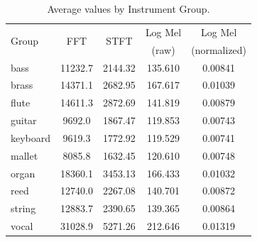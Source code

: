 \documentclass[10pt,conference]{IEEEtran}
\begin{document}

\begin{table}[htb] \small
  \caption{Average values by Instrument Group.}
  \label{tab:means_by_group_updated}
  \begin{tabular*}{\columnwidth}
	{@{\extracolsep{\fill}}lcccc}
    \toprule
    \multirow{2}{*}{Group} & \multirow{2}{*}{FFT} & \multirow{2}{*}{STFT} & Log Mel& Log Mel \\
    &   &   &   (raw)  & (normalized) \\
    \midrule
    bass     & 11232.7 & 2144.32 & 135.610 & 0.00841 \\
    brass    & 14371.1 & 2682.95 & 167.617 & 0.01039 \\
    flute    & 14611.3 & 2872.69 & 141.819 & 0.00879 \\
    guitar   & 9692.0  & 1867.47 & 119.853 & 0.00743 \\
    keyboard & 9619.3  & 1772.92 & 119.529 & 0.00741 \\
    mallet   & 8085.8  & 1632.45 & 120.610 & 0.00748 \\
    organ    & 18360.1 & 3453.13 & 166.433 & 0.01032 \\
    reed     & 12740.0 & 2267.08 & 140.701 & 0.00872 \\
    string   & 12883.7 & 2390.65 & 139.365 & 0.00864 \\
    vocal    & 31028.9 & 5271.26 & 212.646 & 0.01319 \\
    \bottomrule
  \end{tabular*}
  \label{tab:avg_metrics_groups}
\end{table}
\end{document}
